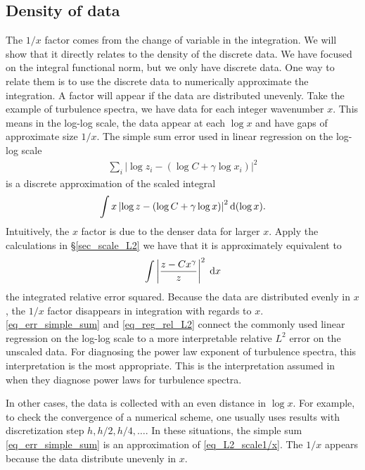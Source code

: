 \documentclass[11pt,letterpaper]{article}
\begin{document}
\subsection{Density of data}
The $1/x$ factor comes from the change of variable in the integration. We will show that it directly relates to the density of the discrete data. We have focused on the integral functional norm, but we only have discrete data. One way to relate them is to use the discrete data to numerically approximate the integration. A factor will appear if the data are distributed unevenly. Take the example of turbulence spectra, we have data for each integer wavenumber $x$. This means in the log-log scale, the data appear at each $\log x$ and have gaps of approximate size $1/x$. The simple sum error used in linear regression on the log-log scale
\begin{align}
    \sum_i \left| \log z_i- (\log C+\gamma \log x_i) \right|^2\label{eq_err_simple_sum}
\end{align}
is a discrete approximation of the scaled integral
\begin{align}
    \int x \left| \log z- (\log C+\gamma \log x) \right|^2 \mathrm{d}(\log x).
\end{align}
Intuitively, the $x$ factor is due to the denser data for larger $x$. Apply the calculations in \S\ref{sec_scale_L2} we have that it is approximately equivalent to
\begin{align}
    \int \left|\frac{z-Cx^\gamma}{z}\right|^2 \;\mathrm{d} x\label{eq_reg_rel_L2}
\end{align}
the integrated relative error squared. Because the data are distributed evenly in $x$, the $1/x$ factor disappears in integration with regards to $x$. \eqref{eq_err_simple_sum} and \eqref{eq_reg_rel_L2} connect the commonly used linear regression on the log-log scale to a more interpretable relative $L^2$ error on the unscaled data. For diagnosing the power law exponent of turbulence spectra, this interpretation is the most appropriate. This is the interpretation assumed in \cite{DuBuhler_23} when they diagnose power laws for turbulence spectra.

In other cases, the data is collected with an even distance in $\log x$. For example, to check the convergence of a numerical scheme, one usually uses results with discretization step $h, h/2, h/4, \dots$. In these situations, the simple sum \eqref{eq_err_simple_sum} is an approximation of \eqref{eq_L2_scale1/x}. The $1/x$ appears because the data distribute unevenly in $x$. 
\end{document}
